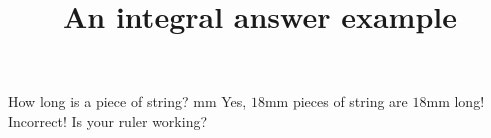 \documentclass[hidesidemenu]{webquiz}
\title{An integral answer example}
\begin{document}
  \begin{question}     %
     How long is a piece of string?
      mm
     \whenRight Yes, $18$mm pieces of string are $18$mm long!
     \whenWrong Incorrect! Is your ruler working?
  \end{question}
\end{document}
